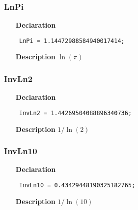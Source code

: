 \documentclass[12pt,a4paper,oneside]{report}
\newcommand{\declarationitem}[1]{\textbf{#1}}
\newcommand{\descriptiontitle}[1]{\textbf{#1}}
\newcommand{\code}[1]{\texttt{#1}}
\begin{document}
\subsubsection{LnPi}
\label{utypes-LnPi}
\begin{itemize}\item[\declarationitem{Declaration}\hfill]
	\begin{flushleft}
		\code{
			LnPi       = 1.14472988584940017414;}
		
	\end{flushleft}
	
	\par
	\item[\descriptiontitle{Description}]
	$\ln(\pi)$
	
\end{itemize}
\subsubsection{InvLn2}
\label{utypes-InvLn2}
\begin{itemize}\item[\declarationitem{Declaration}\hfill]
	\begin{flushleft}
		\code{
			InvLn2     = 1.44269504088896340736;}
		
	\end{flushleft}
	
	\par
	\item[\descriptiontitle{Description}]
	$1/\ln(2)$
	
\end{itemize}
\subsubsection{InvLn10}
\label{utypes-InvLn10}
\begin{itemize}\item[\declarationitem{Declaration}\hfill]
	\begin{flushleft}
		\code{
			InvLn10    = 0.43429448190325182765;}
		
	\end{flushleft}
	
	\par
	\item[\descriptiontitle{Description}]
	$1/\ln(10)$
	
\end{itemize}
\end{document}
